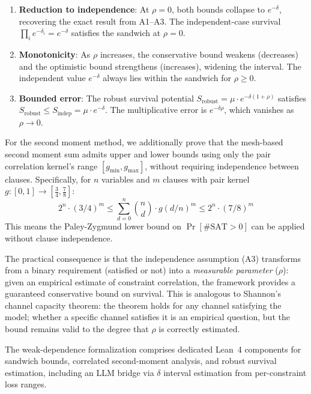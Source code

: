 \documentclass[11pt,a4paper]{article}
\begin{document}
\begin{enumerate}
\item \textbf{Reduction to independence}: At $\rho = 0$, both bounds collapse to $e^{-\delta}$, recovering the exact result from A1--A3. The independent-case survival $\prod_i e^{-\delta_i} = e^{-\delta}$ satisfies the sandwich at $\rho = 0$.

\item \textbf{Monotonicity}: As $\rho$ increases, the conservative bound weakens (decreases) and the optimistic bound strengthens (increases), widening the interval. The independent value $e^{-\delta}$ always lies within the sandwich for $\rho \geq 0$.

\item \textbf{Bounded error}: The robust survival potential $S_{\text{robust}} = \mu \cdot e^{-\delta(1+\rho)}$ satisfies $S_{\text{robust}} \leq S_{\text{indep}} = \mu \cdot e^{-\delta}$. The multiplicative error is $e^{-\delta\rho}$, which vanishes as $\rho \to 0$.
\end{enumerate}

For the second moment method, we additionally prove that the mesh-based second moment sum admits upper and lower bounds using only the pair correlation kernel's range $[g_{\min}, g_{\max}]$, without requiring independence between clauses. Specifically, for $n$ variables and $m$ clauses with pair kernel $g: [0,1] \to [\tfrac{3}{4}, \tfrac{7}{8}]$:
\[
2^n \cdot (3/4)^m \leq \sum_{d=0}^{n} \binom{n}{d} \cdot g(d/n)^m \leq 2^n \cdot (7/8)^m
\]
This means the Paley-Zygmund lower bound on $\Pr[\#\text{SAT} > 0]$ can be applied without clause independence.

The practical consequence is that the independence assumption (A3) transforms from a binary requirement (satisfied or not) into a \emph{measurable parameter} ($\rho$): given an empirical estimate of constraint correlation, the framework provides a guaranteed conservative bound on survival. This is analogous to Shannon's channel capacity theorem: the theorem holds for any channel satisfying the model; whether a specific channel satisfies it is an empirical question, but the bound remains valid to the degree that $\rho$ is correctly estimated.

The weak-dependence formalization comprises dedicated Lean~4 components for sandwich bounds, correlated second-moment analysis, and robust survival estimation, including an LLM bridge via $\delta$ interval estimation from per-constraint loss ranges.

\end{document}
